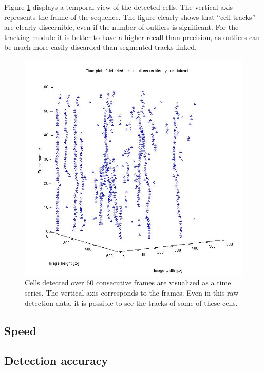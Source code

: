 	
		Figure \ref{fig:cell_tracks_detection} displays a temporal view of the detected cells. The vertical axis represents the frame of the sequence. The figure clearly shows that ``cell tracks'' are clearly discernible, even if the number of outliers is significant. For the tracking module it is better to have a higher recall than precision, as outliers can be much more easily discarded than segmented tracks linked.
		\begin{figure}
			  \includegraphics[width=\textwidth]{images/cell_tracks}
			\caption{Cells detected over 60 consecutive frames are visualized as a time series. The vertical axis corresponds to the frames. Even in this raw detection data, it is possible to see the tracks of some of these cells.}
		    \label{fig:cell_tracks_detection}
		\end{figure}
		
			\subsection{Speed }
		
		\subsection{Detection accuracy }
